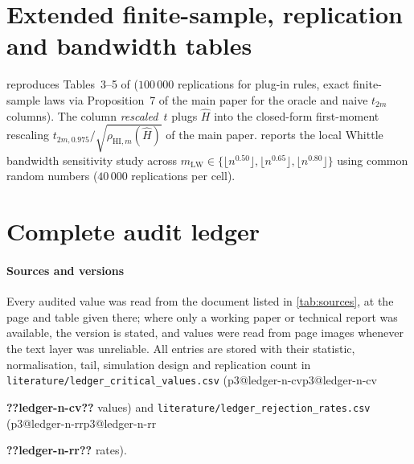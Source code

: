\documentclass[final,3p,11pt]{elsarticle}
\makeatletter
\newcommand{\pthree}[1]{\ifcsname p3@#1\endcsname\csname p3@#1\endcsname\else
  \PackageError{p3numbers}{Undefined number key '#1'}{Run make_numbers.py}\textbf{??#1??}\fi}
\makeatother
\begin{document}
\begin{table}[tbp]\centering\small
\caption{Certified two-sided 5\% critical values for the periodogram and cosine tests.}\label{tab:fixedfull}
\footnotesize\setlength{\tabcolsep}{3.2pt}%
\end{table}

\FloatBarrier

\section{Extended finite-sample, replication and bandwidth tables}\label{supp:finite}

 reproduces Tables~3--5 of \citet{HI17} ($100\,000$ replications for plug-in rules, exact finite-sample laws via Proposition~7 of the main paper for the oracle and naive $t_{2m}$ columns). The column \emph{rescaled~$t$} plugs $\hat H$ into the closed-form first-moment rescaling $t_{2m,0.975}/\sqrt{\rho_{\mathrm{HI},m}(\hat H)}$ of the main paper.  reports the local Whittle bandwidth sensitivity study across $m_{\mathrm{LW}}\in\{\lfloor n^{0.50}\rfloor,\lfloor n^{0.65}\rfloor,\lfloor n^{0.80}\rfloor\}$ using common random numbers ($40\,000$ replications per cell).

\begin{table}[tbp]\centering\small
\caption{Simulated plug-in and exact Gaussian rejection percentages in the Hualde--Iacone designs.}\label{tab:hi17}
\footnotesize\setlength{\tabcolsep}{4.2pt}%
\end{table}

\begin{table}[tbp]\centering\small
\caption{Simulated rejection percentages under pure long memory across three local Whittle bandwidths.}\label{tab:bw}
\footnotesize\setlength{\tabcolsep}{4.5pt}%
\end{table}

\FloatBarrier

\section{Complete audit ledger}\label{supp:audit}

\paragraph{Sources and versions} Every audited value was read from the document listed in \cref{tab:sources}, at the page and table given there; where only a working paper or technical report was available, the version is stated, and values were read from page images whenever the text layer was unreliable. All entries are stored with their statistic, normalisation, tail, simulation design and replication count in \texttt{literature/ledger\_critical\_values.csv} (\pthree{ledger-n-cv} values) and \texttt{literature/ledger\_rejection\_rates.csv} (\pthree{ledger-n-rr} rates).
\end{document}
